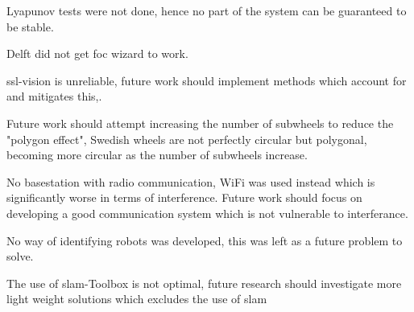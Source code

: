 Lyapunov tests were not done, hence no part of the system can be guaranteed to be stable\:\cite{borkar_stability_2023}.

Delft did not get \acs{foc} wizard to work.


\ac{ssl}-vision is unreliable, future work should implement methods which account for and mitigates this\:\cite{huang_zjunlict_2019},\cite{bohm_er-force_2024}.

Future work should attempt increasing the number of subwheels to reduce the "polygon effect", Swedish wheels are not perfectly circular but polygonal, becoming more circular as the number of subwheels increase\:\cite{chen_zjunlict_2018}.

No basestation with radio communication, WiFi was used instead which is significantly worse in terms of interference. Future work should focus on developing a good communication system which is not vulnerable to interferance.

No way of identifying robots was developed, this was left as a future problem to solve.

The use of \acs{slam}-Toolbox is not optimal, future research should investigate more light weight solutions which excludes the use of \ac{slam}


\begin{comment}
Here you present the interpretation of the results and assess their significance. Discuss possible implications of the results, and offer possible recommendations. You must report on whether you have achieved the objectives you set out, answering your research question and achieving the aim of your work. The section should also include reflections on the job and its limitations.  You can also discuss solutions to problems that you have identified and discussed earlier or address other issues that the work did not address, questions that were not answered. Also, link your findings to previous work. This way, the discussion can become a conversation with what you wrote in the last section.  Finally, put your work in a broader context, and broaden your perspective. Can your results be generalised? Can what you have done be used in some other context?
\end{comment}

